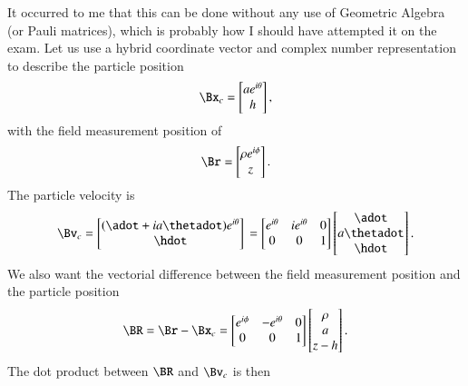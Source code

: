 {It occurred to me that this can be done without any use of Geometric Algebra (or Pauli matrices), which is probably how I should have attempted it on the exam.  Let us use a hybrid coordinate vector and complex number representation to describe the particle position
%
\begin{equation}\label{eqn:relativisticElectrodynamicsExamReflection:800}
\Bx_c =
\begin{bmatrix}
a e^{i\theta} \\
h
\end{bmatrix},
\end{equation}
with the field measurement position of
\begin{equation}\label{eqn:relativisticElectrodynamicsExamReflection:820}
\Br =
\begin{bmatrix}
\rho e^{i\phi} \\
z
\end{bmatrix}.
\end{equation}
%
The particle velocity is
%
\begin{equation}\label{eqn:relativisticElectrodynamicsExamReflection:840}
\Bv_c
=
\begin{bmatrix}
(\adot + i a \thetadot) e^{i\theta} \\
\hdot
\end{bmatrix} \\
=
\begin{bmatrix}
e^{i\theta} & i e^{i\theta} & 0 \\
0 & 0 & 1
\end{bmatrix}
\begin{bmatrix}
\adot \\
a \thetadot \\
\hdot
\end{bmatrix}.
\end{equation}
%
We also want the vectorial difference between the field measurement position and the particle position
%
\begin{equation}\label{eqn:relativisticElectrodynamicsExamReflection:860}
\BR = \Br - \Bx_c =
\begin{bmatrix}
e^{i\phi} & -e^{i\theta} & 0 \\
0 & 0 & 1
\end{bmatrix}
\begin{bmatrix}
\rho \\
a \\
z - h
\end{bmatrix}.
\end{equation}
%
The dot product between \(\BR\) and \(\Bv_c\) is then
}
